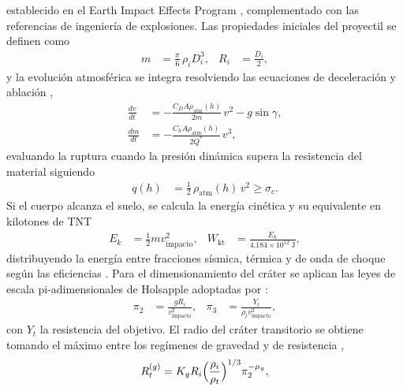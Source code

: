 \documentclass[conference]{IEEEtran}
\begin{document}
\begin{itemize}
	      establecido en el Earth Impact Effects Program \cite{collins2005},
	      complementado con las referencias de ingeniería de explosiones. Las
	      propiedades iniciales del proyectil se definen como
	      \begin{align}
		      m   & = \tfrac{\pi}{6}\,\rho_i D_i^3,          &
		      R_i & = \tfrac{D_i}{2}, \label{eq:impact-mass}
	      \end{align}
	      y la evolución atmosférica se integra resolviendo las ecuaciones de
	      deceleración y ablación \cite{collins2005},
	      \begin{align}
		      \frac{dv}{dt} & = -\frac{C_D A \rho_{\text{atm}}(h)}{2 m}\,v^2 - g\sin\gamma, \label{eq:drag} \\
		      \frac{dm}{dt} & = -\frac{C_h A \rho_{\text{atm}}(h)}{2 Q^*}\,v^3, \label{eq:ablation}
	      \end{align}
	      evaluando la ruptura cuando la presión dinámica supera la resistencia del
	      material siguiendo
	      \begin{align}
		      q(h) & = \tfrac{1}{2}\,\rho_{\text{atm}}(h)\,v^2 \ge \sigma_c. \label{eq:breakup}
	      \end{align}
	      Si el cuerpo alcanza el suelo, se calcula la energía cinética y su
	      equivalente en kilotones de TNT
	      \begin{align}
		      E_k           & = \tfrac{1}{2} m v_{\text{impacto}}^2,                          &
		      W_{\text{kt}} & = \frac{E_k}{4.184 \times 10^{12}\ \text{J}}, \label{eq:energy}
	      \end{align}
	      distribuyendo la energía entre fracciones sísmica, térmica y de onda de
	      choque según las eficiencias \cite{collins2005,glasstone1977}. Para el
	      dimensionamiento del cráter se aplican las leyes de escala
	      pi-adimensionales de Holsapple adoptadas por \cite{collins2005}:
	      \begin{align}
		      \pi_2 & = \frac{g R_i}{v_{\text{impacto}}^2},                           &
		      \pi_3 & = \frac{Y_t}{\rho_t v_{\text{impacto}}^2}, \label{eq:pi-groups}
	      \end{align}
	      con $Y_t$ la resistencia del objetivo. El radio del cráter transitorio se
	      obtiene tomando el máximo entre los regímenes de gravedad y de resistencia
	      \cite{collins2005,holsapple1993},
	      \begin{align}
		      R_t^{(g)} & = K_g R_i \Bigl(\frac{\rho_i}{\rho_t}\Bigr)^{1/3}\pi_2^{-\mu_g}, \label{eq:rt-gravity}  \\

\end{align}
\end{itemize}
\end{document}

